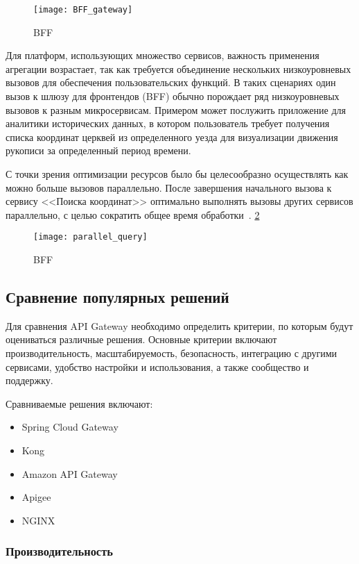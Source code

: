 \begin{figure}[htbp]
    \centering
    \texttt{[image: BFF\_gateway]}
    \caption{BFF}
    \label{fig:bff_gate}
\end{figure}

Для платформ, использующих множество сервисов, важность применения агрегации возрастает, так как
требуется объединение нескольких низкоуровневых вызовов для обеспечения пользовательских функций.
В
таких сценариях один вызов к шлюзу для фронтендов (BFF) обычно порождает ряд низкоуровневых вызовов
к разным микросервисам.
Примером может послужить приложение для аналитики исторических данных, в
котором
пользователь требует получения списка координат церквей из определенного уезда для визуализации
движения рукописи
за определенный период времени.

С точки зрения оптимизации ресурсов было бы целесообразно осуществлять как можно больше вызовов
параллельно.
После завершения начального вызова к сервису <<Поиска координат>> оптимально выполнять
вызовы других сервисов параллельно, с целью сократить общее время обработки~\cite{BFF}.
\ref{fig:parrallel_query}
\begin{figure}[htbp]
    \centering
    \texttt{[image: parallel\_query]}
    \caption{BFF}
    \label{fig:parrallel_query}
\end{figure}

\subsection{Сравнение популярных решений}

Для сравнения API Gateway необходимо определить критерии, по которым будут оцениваться различные решения.
Основные
критерии включают производительность, масштабируемость, безопасность, интеграцию с другими сервисами, удобство настройки
и использования, а также сообщество и поддержку.

Сравниваемые решения включают:
\begin{itemize}
    \item Spring Cloud Gateway
    \item  Kong
    \item Amazon API Gateway
    \item Apigee
    \item NGINX

\end{itemize}

\subsubsection{Производительность}

